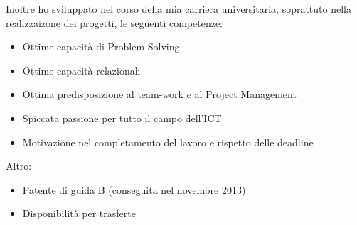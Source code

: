 \vspace{0.5em}
Inoltre ho sviluppato nel corso della mia carriera universitaria, soprattuto nella realizzaizone dei progetti, le seguenti competenze:
\begin{itemize}
	\item Ottime capacit\`a di Problem Solving
	\item Ottime capacit\`a relazionali
  \item Ottima predisposizione al team-work e al Project Management
	\item Spiccata passione per tutto il campo dell'ICT
	\item Motivazione nel completamento del lavoro e rispetto delle deadline
\end{itemize}
\vspace{1em}
Altro:
\begin{itemize}
	\item Patente di guida B (conseguita nel novembre 2013)
	\item Disponibilit\`a per trasferte
\end{itemize}
